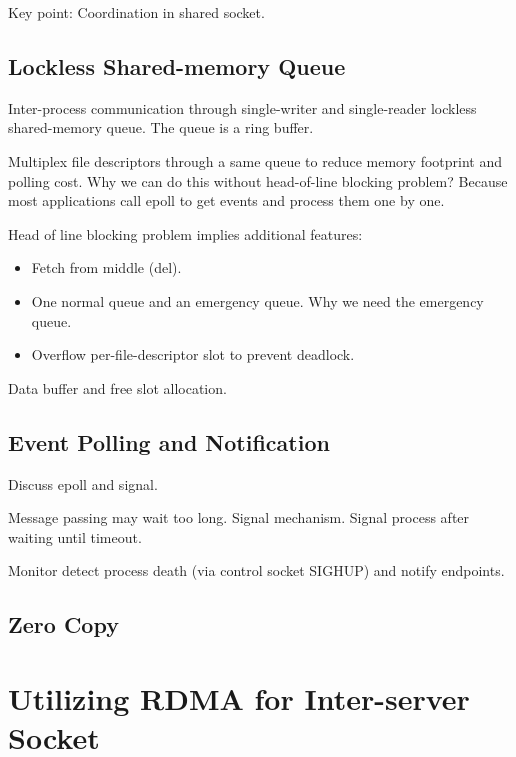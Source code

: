 Key point: Coordination in shared socket.

\subsection{Lockless Shared-memory Queue}

Inter-process communication through single-writer and single-reader lockless shared-memory queue. The queue is a ring buffer.

Multiplex file descriptors through a same queue to reduce memory footprint and polling cost. Why we can do this without head-of-line blocking problem? Because most applications call epoll to get events and process them one by one.


Head of line blocking problem implies additional features:
\begin{itemize}
	\item Fetch from middle (del).
	\item One normal queue and an emergency queue. Why we need the emergency queue.
	\item Overflow per-file-descriptor slot to prevent deadlock.
\end{itemize}

Data buffer and free slot allocation.

\subsection{Event Polling and Notification}

Discuss epoll and signal.

Message passing may wait too long.
Signal mechanism. Signal process after waiting until timeout.

Monitor detect process death (via control socket SIGHUP) and notify endpoints.


\subsection{Zero Copy}



\section{Utilizing RDMA for Inter-server Socket}
\label{sec:rdma}

